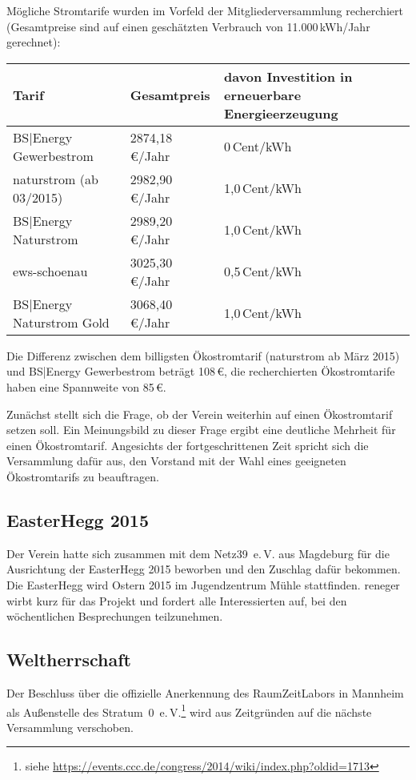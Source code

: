 \documentclass[a4paper,12pt]{scrartcl}
\begin{document}
Mögliche Stromtarife wurden im Vorfeld der Mitgliederversammlung recherchiert
(Gesamtpreise sind auf einen geschätzten Verbrauch von 11{.}000\,kWh/Jahr
gerechnet):

\begin{tabular}{|l|l|p{7cm}|}
  \hline
  \textbf{Tarif} & \textbf{Gesamtpreis} & \textbf{davon Investition in
    erneuerbare Energieerzeugung} \\ \hline
  BS|Energy Gewerbestrom & 2874{,}18\,€/Jahr & 0\,Cent/kWh \\ \hline
  naturstrom (ab 03/2015) & 2982{,}90\,€/Jahr & 1{,}0\,Cent/kWh \\ \hline
  BS|Energy Naturstrom & 2989{,}20\,€/Jahr & 1{,}0\,Cent/kWh \\ \hline
  ews-schoenau & 3025{,}30\,€/Jahr & 0{,}5\,Cent/kWh \\ \hline
  BS|Energy Naturstrom Gold & 3068{,}40\,€/Jahr & 1{,}0\,Cent/kWh \\ \hline
\end{tabular}

Die Differenz zwischen dem billigsten Ökostromtarif (naturstrom ab März 2015)
und BS|Energy Gewerbestrom beträgt 108\,€, die recherchierten
Ökostromtarife haben eine Spannweite von 85\,€.

Zunächst stellt sich die Frage, ob der Verein weiterhin auf einen Ökostromtarif
setzen soll. Ein Meinungsbild zu dieser Frage ergibt eine deutliche Mehrheit für
einen Ökostromtarif. Angesichts der fortgeschrittenen Zeit spricht sich die
Versammlung dafür aus, den Vorstand mit der Wahl eines geeigneten Ökostromtarifs
zu beauftragen.

\subsection{EasterHegg 2015}\label{sec:eh15}
Der Verein hatte sich zusammen mit dem Netz39~e.\,V. aus Magdeburg für die
Ausrichtung der EasterHegg 2015 beworben und den Zuschlag dafür bekommen. Die
EasterHegg wird Ostern 2015 im Jugendzentrum Mühle stattfinden. reneger wirbt
kurz für das Projekt und fordert alle Interessierten auf, bei den wöchentlichen
Besprechungen teilzunehmen.

\subsection{Weltherrschaft}
\postponed
{}
Der Beschluss über die offizielle Anerkennung des RaumZeitLabors in Mannheim als
Außen\-stelle des Stratum~0~e.\,V.\footnote{siehe
\url{https://events.ccc.de/congress/2014/wiki/index.php?oldid=1713}} wird aus
Zeitgründen auf die nächste Versammlung verschoben.
\end{document}
